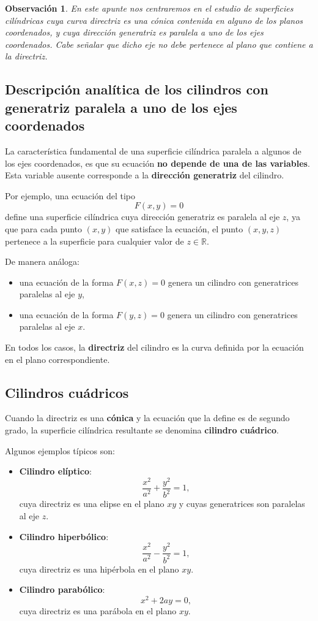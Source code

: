 \documentclass[11pt]{article}
\newtheorem{obs}[teo]{Observación}%
\begin{document}
\begin{obs}
En este apunte nos centraremos en el estudio de superficies cilíndricas cuya curva directriz es una cónica contenida en alguno de los planos coordenados, y cuya dirección generatriz es paralela a uno de los ejes coordenados. Cabe señalar que dicho eje  no debe pertenece al plano que contiene a la directriz.
\end{obs}





\subsection*{Descripción analítica de los cilindros con generatriz paralela a uno de los ejes coordenados}

La característica fundamental de una superficie cilíndrica paralela a algunos de los ejes coordenados, es que su ecuación \textbf{no depende de una de las variables}. Esta variable ausente corresponde a la \textbf{dirección generatriz} del cilindro.

Por ejemplo, una ecuación del tipo
\[
F(x,y)=0
\]
define una superficie cilíndrica cuya dirección generatriz es paralela al eje $z$, ya que para cada punto $(x,y)$ que satisface la ecuación, el punto $(x,y,z)$ pertenece a la superficie para cualquier valor de $z\in\mathbb{R}$.

De manera análoga:
\begin{itemize}
    \item una ecuación de la forma $F(x,z)=0$ genera un cilindro con generatrices paralelas al eje $y$,
    \item una ecuación de la forma $F(y,z)=0$ genera un cilindro con generatrices paralelas al eje $x$.
\end{itemize}

En todos los casos, la \textbf{directriz} del cilindro es la curva definida por la ecuación en el plano correspondiente.

\subsection*{Cilindros cuádricos}

Cuando la directriz es una \textbf{cónica} y la ecuación que la define es de segundo grado, la superficie cilíndrica resultante se denomina \textbf{cilindro cuádrico}.

Algunos ejemplos típicos son:
\begin{itemize}
    \item \textbf{Cilindro elíptico}:
    \[
    \frac{x^2}{a^2}+\frac{y^2}{b^2}=1,
    \]
    cuya directriz es una elipse en el plano $xy$ y cuyas generatrices son paralelas al eje $z$.

    \item \textbf{Cilindro hiperbólico}:
    \[
    \frac{x^2}{a^2}-\frac{y^2}{b^2}=1,
    \]
    cuya directriz es una hipérbola en el plano $xy$.

    \item \textbf{Cilindro parabólico}:
    \[
    x^2+2ay=0,
    \]
    cuya directriz es una parábola en el plano $xy$.
\end{itemize}
\end{document}
